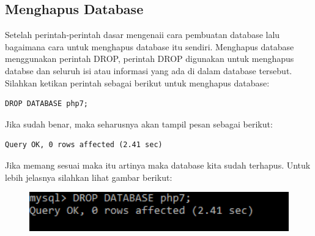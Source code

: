 \subsection{Menghapus Database}
Setelah perintah-perintah dasar mengenaii cara pembuatan database lalu bagaimana cara untuk menghapus database itu sendiri. Menghapus database menggunakan perintah DROP, perintah DROP digunakan untuk menghapus databse dan seluruh isi atau informasi yang ada di dalam database tersebut. Silahkan ketikan perintah sebagai berikut untuk menghapus database:
\begin{lstlisting}
DROP DATABASE php7;
\end{lstlisting}
Jika sudah benar, maka seharusnya akan tampil pesan sebagai berikut:
\begin{lstlisting}
Query OK, 0 rows affected (2.41 sec)
\end{lstlisting}
Jika memang sesuai maka itu artinya maka database kita sudah terhapus. Untuk lebih jelasnya silahkan lihat gambar berikut:
 \begin{figure}[ht]
\centerline{\includegraphics[width=1\textwidth]
{figures/drop}}
\caption{}
\label{drop}
  \end{figure}

